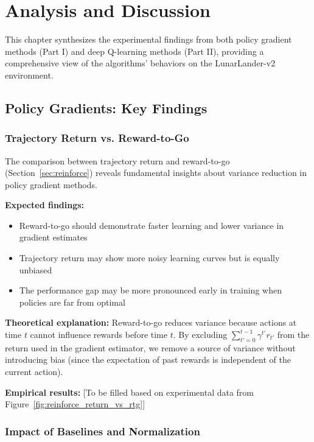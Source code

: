 \documentclass[11pt, a4paper, oneside]{memoir}
\begin{document}
\chapter{Analysis and Discussion}
\label{ch:analysis}

This chapter synthesizes the experimental findings from both policy gradient methods (Part I) and deep Q-learning methods (Part II), providing a comprehensive view of the algorithms' behaviors on the LunarLander-v2 environment.

\section{Policy Gradients: Key Findings}

\subsection{Trajectory Return vs. Reward-to-Go}

The comparison between trajectory return and reward-to-go (Section~\ref{sec:reinforce}) reveals fundamental insights about variance reduction in policy gradient methods.

\textbf{Expected findings:}
\begin{itemize}
\item Reward-to-go should demonstrate faster learning and lower variance in gradient estimates
\item Trajectory return may show more noisy learning curves but is equally unbiased
\item The performance gap may be more pronounced early in training when policies are far from optimal
\end{itemize}

\textbf{Theoretical explanation:} Reward-to-go reduces variance because actions at time $t$ cannot influence rewards before time $t$. By excluding $\sum_{t'=0}^{t-1} \gamma^{t'} r_{t'}$ from the return used in the gradient estimator, we remove a source of variance without introducing bias (since the expectation of past rewards is independent of the current action).

\textbf{Empirical results:} [To be filled based on experimental data from Figure~\ref{fig:reinforce_return_vs_rtg}]

\subsection{Impact of Baselines and Normalization}
\end{document}
